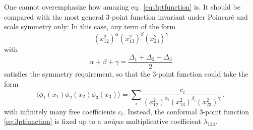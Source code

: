 \documentclass[a4paper,12pt]{article}
\numberwithin{equation}{section}
\begin{document}
One cannot overemphasize how amazing eq.~\eqref{eq:3ptfunction} is. It should be compared with the most general 3-point function invariant under Poincaré and scale symmetry only: In this case, any term of the form
\begin{equation}
	(x_{12}^2)^\alpha
	(x_{13}^2)^\beta
	(x_{23}^2)^\gamma
\end{equation}
with
\begin{equation}
	\alpha + \beta + \gamma = \frac{\Delta_1 + \Delta_2 + \Delta_3}{2}
\end{equation}
satisfies the symmetry requirement, so that the 3-point function  could take the form
\begin{equation}
	\langle \phi_1(x_1) \phi_2(x_2) \phi_3(x_3) \rangle
	= \sum_i \frac{c_i}
	{(x_{12}^2)^{\alpha_i}
	(x_{13}^2)^{\beta_i}
	(x_{23}^2)^{\gamma_i}},
\end{equation}
with infinitely many free coefficients $c_i$. Instead, the conformal 3-point function \eqref{eq:3ptfunction} is fixed up to a \emph{unique} multiplicative coefficient $\lambda_{123}$.
\end{document}
